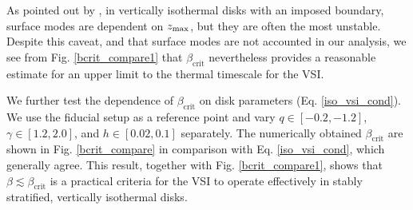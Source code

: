 As pointed out by , in vertically isothermal disks with
an imposed boundary, surface modes are dependent on $z_\mathrm{max}$, but they
are often the most unstable. Despite this caveat, and that surface
modes are not accounted in our analysis, we see from
Fig. \ref{bcrit_compare1} that $\beta_\mathrm{crit}$ nevertheless
provides a reasonable estimate for an upper limit to the thermal
timescale for the VSI.  

We further  test the dependence of $\beta_\mathrm{crit}$ on disk parameters
(Eq. \ref{iso_vsi_cond}).  We use the fiducial setup as a  reference
point and vary $q\in[-0.2,-1.2]$,  $\gamma\in[1.2,2.0]$, and
$ h\in[0.02,0.1]$ separately. The numerically obtained
$\beta_\mathrm{crit}$ are shown in Fig. \ref{bcrit_compare} in
comparison with Eq. \ref{iso_vsi_cond}, which generally agree. This
result, together with Fig. \ref{bcrit_compare1}, shows that  
$\beta \lesssim \beta_\mathrm{crit}$ is a practical
criteria for the VSI to operate effectively in stably stratified,
vertically isothermal disks.   


